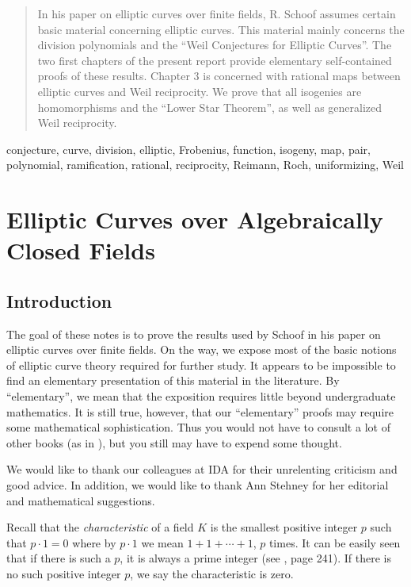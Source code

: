 \maketitle

\begin{abstract}
In his paper on elliptic curves over finite fields, R. Schoof assumes certain basic material concerning elliptic curves. This material mainly concerns the division polynomials and the ``Weil Conjectures for Elliptic Curves''. The two first chapters of the present report provide elementary self-contained proofs of these results. Chapter 3 is concerned with rational maps between elliptic curves and Weil reciprocity. We prove that all isogenies are homomorphisms and the ``Lower Star Theorem'', as well as generalized Weil reciprocity.
\end{abstract}

\begin{keywords}
conjecture, curve, division, elliptic, Frobenius, 
function, isogeny, map, pair, polynomial, ramification, 
rational, reciprocity, Reimann, Roch, uniformizing, Weil
\end{keywords}

\chapter{Elliptic Curves over Algebraically Closed Fields}
\label{chapter1}
\section{Introduction}

The goal of these notes is to prove the results used by Schoof in his paper on elliptic curves over finite fields. On the way, we expose most of the basic notions of elliptic curve theory required for further study. It appears to be impossible to find an elementary presentation of this material in the literature. By ``elementary'', we mean that the exposition requires little beyond undergraduate mathematics. It is still true, however, that our ``elementary'' proofs may require some mathematical sophistication. Thus you would not have to consult a lot of other books (as in \cite{r1.6}), but you still may have to expend some thought.

We would like to thank our colleagues at IDA for their unrelenting criticism and good advice. In addition, we would like to thank Ann Stehney for her editorial and mathematical suggestions.

Recall that the {\it characteristic} of a field $K$ is the smallest positive integer $p$ such that $p\cdot 1=0$ where by $p\cdot 1$ we mean $1+1+\cdots+1$, $p$ times. It can be easily seen that if there is such a $p$, it is always a prime integer (see \cite{r1.4}, page 241). If there is no such positive integer $p$, we say the characteristic is zero.

